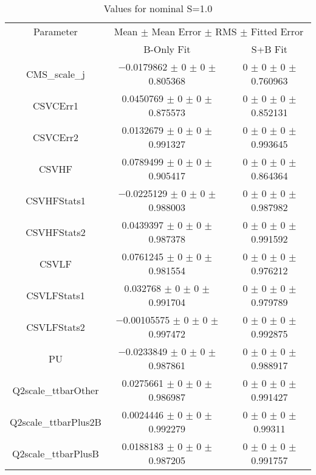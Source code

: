 \begin{table}
\centering
\caption{Values for nominal S=1.0}
\begin{tabular}{ccc}
\toprule
Parameter & \multicolumn{2}{c}{Mean $\pm$ Mean Error $\pm$ RMS $\pm$ Fitted Error}\\
 & B-Only Fit & S+B Fit\\
\midrule
CMS\_scale\_j & \num{-0.0179862} $\pm$ \num{0} $\pm$ \num{0} $\pm$ \num{0.805368} & \num{0} $\pm$ \num{0} $\pm$ \num{0} $\pm$ \num{0.760963}\\
CSVCErr1 & \num{0.0450769} $\pm$ \num{0} $\pm$ \num{0} $\pm$ \num{0.875573} & \num{0} $\pm$ \num{0} $\pm$ \num{0} $\pm$ \num{0.852131}\\
CSVCErr2 & \num{0.0132679} $\pm$ \num{0} $\pm$ \num{0} $\pm$ \num{0.991327} & \num{0} $\pm$ \num{0} $\pm$ \num{0} $\pm$ \num{0.993645}\\
CSVHF & \num{0.0789499} $\pm$ \num{0} $\pm$ \num{0} $\pm$ \num{0.905417} & \num{0} $\pm$ \num{0} $\pm$ \num{0} $\pm$ \num{0.864364}\\
CSVHFStats1 & \num{-0.0225129} $\pm$ \num{0} $\pm$ \num{0} $\pm$ \num{0.988003} & \num{0} $\pm$ \num{0} $\pm$ \num{0} $\pm$ \num{0.987982}\\
CSVHFStats2 & \num{0.0439397} $\pm$ \num{0} $\pm$ \num{0} $\pm$ \num{0.987378} & \num{0} $\pm$ \num{0} $\pm$ \num{0} $\pm$ \num{0.991592}\\
CSVLF & \num{0.0761245} $\pm$ \num{0} $\pm$ \num{0} $\pm$ \num{0.981554} & \num{0} $\pm$ \num{0} $\pm$ \num{0} $\pm$ \num{0.976212}\\
CSVLFStats1 & \num{0.032768} $\pm$ \num{0} $\pm$ \num{0} $\pm$ \num{0.991704} & \num{0} $\pm$ \num{0} $\pm$ \num{0} $\pm$ \num{0.979789}\\
CSVLFStats2 & \num{-0.00105575} $\pm$ \num{0} $\pm$ \num{0} $\pm$ \num{0.997472} & \num{0} $\pm$ \num{0} $\pm$ \num{0} $\pm$ \num{0.992875}\\
PU & \num{-0.0233849} $\pm$ \num{0} $\pm$ \num{0} $\pm$ \num{0.987861} & \num{0} $\pm$ \num{0} $\pm$ \num{0} $\pm$ \num{0.988917}\\
Q2scale\_ttbarOther & \num{0.0275661} $\pm$ \num{0} $\pm$ \num{0} $\pm$ \num{0.986987} & \num{0} $\pm$ \num{0} $\pm$ \num{0} $\pm$ \num{0.991427}\\
Q2scale\_ttbarPlus2B & \num{0.0024446} $\pm$ \num{0} $\pm$ \num{0} $\pm$ \num{0.992279} & \num{0} $\pm$ \num{0} $\pm$ \num{0} $\pm$ \num{0.99311}\\
Q2scale\_ttbarPlusB & \num{0.0188183} $\pm$ \num{0} $\pm$ \num{0} $\pm$ \num{0.987205} & \num{0} $\pm$ \num{0} $\pm$ \num{0} $\pm$ \num{0.991757}\\

\end{tabular}
\end{table}
